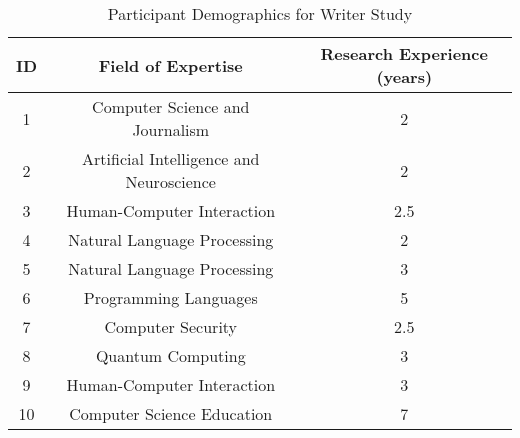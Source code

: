 \begin{table}[]
\begin{tabular}{|c|c|c|}
\hline
\textbf{ID} &  \textbf{Field of Expertise}              & \textbf{Research Experience (years)} \\ \hline
1                    & Computer Science and Journalism          & 2                            \\ \hline
2                    & Artificial Intelligence and Neuroscience & 2                            \\ \hline
3                    & Human-Computer Interaction               & 2.5                          \\ \hline
4                  & Natural Language Processing              & 2                            \\ \hline
5                    & Natural Language Processing              & 3                            \\ \hline
6                       & Programming Languages                    & 5                            \\ \hline
7                      & Computer Security                        & 2.5                          \\ \hline
8                      & Quantum Computing                        & 3                            \\ \hline
9                  & Human-Computer Interaction               & 3                            \\ \hline
10                   & Computer Science Education               & 7                            \\ \hline
\end{tabular}
\caption{Participant Demographics for Writer Study}
\label{tab:my-table}
\end{table}





